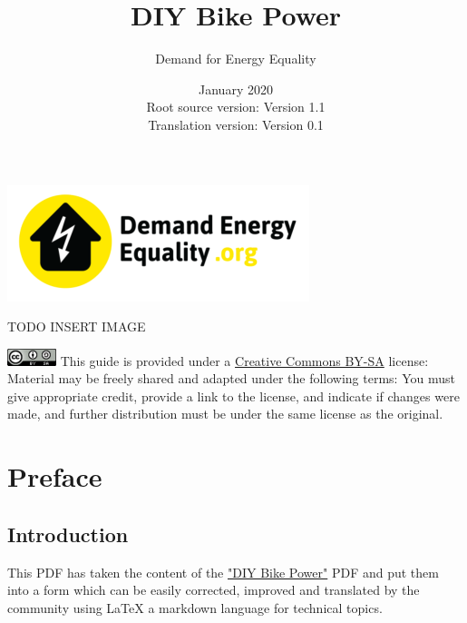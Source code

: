 \documentclass{article}
\title{DIY Bike Power}
\author{Demand for Energy Equality}
\date{January 2020 \\ Root source version: Version 1.1 \\ Translation version: Version 0.1}
\theoremstyle{definition}
\theoremstyle{definition}
\theoremstyle{remark}
\begin{document}
 
\maketitle{}

\begin{center}
  \includegraphics[width=0.25\paperwidth]{../Images/image_0_0_(demand_energy_equality).png}
\end{center}

TODO INSERT IMAGE

\vfill
  
\includegraphics[]{../Images/image_0_2_(license).png} \newline
This guide is provided under a \href{https://creativecommons.org/licenses/by-sa/4.0/legalcode}{Creative Commons BY-SA} license: \newline
Material may be freely shared and adapted under the following terms: You must give appropriate credit, provide a link to the license, and indicate if changes were made, and further distribution must be under the same license as the original.

\newpage

\tableofcontents

\newpage

\section{Preface} %
\label{sec:preface}

  \subsection*{Introduction} %
  \label{sub:introduction}
  
    This PDF has taken the content of the \href{https://www.demandenergyequality.org/build-your-own-bike-generators}{"DIY Bike Power"} PDF and put them into a form which can be easily corrected, improved and translated by the community using LaTeX a markdown language for technical topics.
\end{document}
